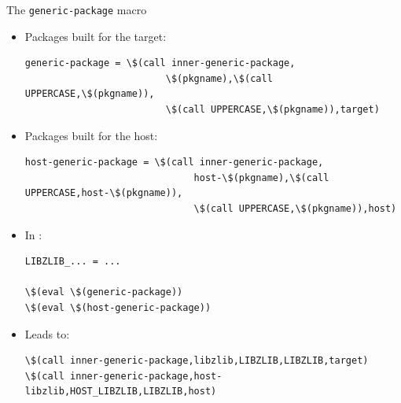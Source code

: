 \begin{frame}[fragile]{The {\tt generic-package} macro}

\begin{itemize}
\item Packages built for the target:
\begin{block}{}
\begin{verbatim}
generic-package = \$(call inner-generic-package,
                         \$(pkgname),\$(call UPPERCASE,\$(pkgname)),
                         \$(call UPPERCASE,\$(pkgname)),target)
\end{verbatim}
\end{block}

\item Packages built for the host:
\begin{block}{}
\begin{verbatim}
host-generic-package = \$(call inner-generic-package,
                              host-\$(pkgname),\$(call UPPERCASE,host-\$(pkgname)),
                              \$(call UPPERCASE,\$(pkgname)),host)
\end{verbatim}
\end{block}

\item In :
\begin{block}{}
\begin{verbatim}
LIBZLIB_... = ...

\$(eval \$(generic-package))
\$(eval \$(host-generic-package))
\end{verbatim}
\end{block}

\item Leads to:
\begin{block}{}
\begin{verbatim}
\$(call inner-generic-package,libzlib,LIBZLIB,LIBZLIB,target)
\$(call inner-generic-package,host-libzlib,HOST_LIBZLIB,LIBZLIB,host)
\end{verbatim}
\end{block}

\end{itemize}

\end{frame}

